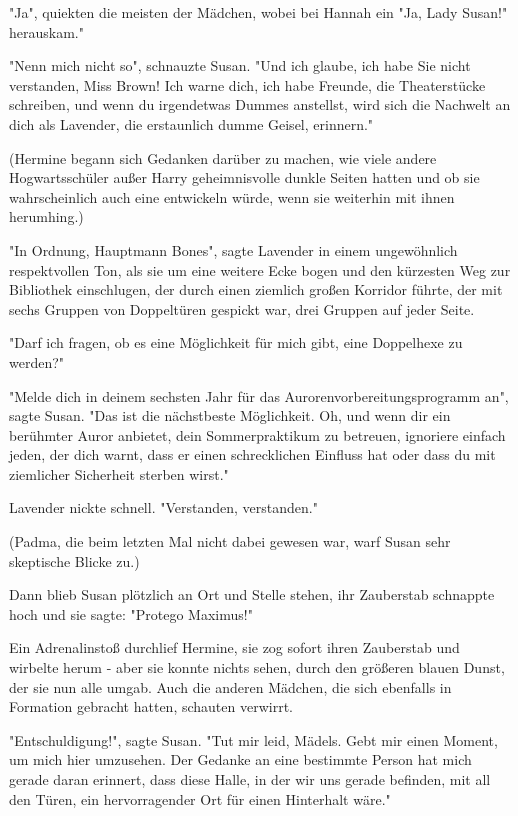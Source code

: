 {"Ja", quiekten die meisten der Mädchen, wobei bei Hannah ein "Ja, Lady Susan!" herauskam."

"Nenn mich nicht so", schnauzte Susan. "Und ich glaube, ich habe Sie nicht verstanden, Miss Brown! Ich warne dich, ich habe Freunde, die Theaterstücke schreiben, und wenn du irgendetwas Dummes anstellst, wird sich die Nachwelt an dich als Lavender, die erstaunlich dumme Geisel, erinnern."

(Hermine begann sich Gedanken darüber zu machen, wie viele andere Hogwartsschüler außer Harry geheimnisvolle dunkle Seiten hatten und ob sie wahrscheinlich auch eine entwickeln würde, wenn sie weiterhin mit ihnen herumhing.)

"In Ordnung, Hauptmann Bones", sagte Lavender in einem ungewöhnlich respektvollen Ton, als sie um eine weitere Ecke bogen und den kürzesten Weg zur Bibliothek einschlugen, der durch einen ziemlich großen Korridor führte, der mit sechs Gruppen von Doppeltüren gespickt war, drei Gruppen auf jeder Seite.

"Darf ich fragen, ob es eine Möglichkeit für mich gibt, eine Doppelhexe zu werden?"

"Melde dich in deinem sechsten Jahr für das Aurorenvorbereitungsprogramm an", sagte Susan. "Das ist die nächstbeste Möglichkeit. Oh, und wenn dir ein berühmter Auror anbietet, dein Sommerpraktikum zu betreuen, ignoriere einfach jeden, der dich warnt, dass er einen schrecklichen Einfluss hat oder dass du mit ziemlicher Sicherheit sterben wirst."

Lavender nickte schnell. "Verstanden, verstanden."

(Padma, die beim letzten Mal nicht dabei gewesen war, warf Susan sehr skeptische Blicke zu.)

Dann blieb Susan plötzlich an Ort und Stelle stehen, ihr Zauberstab schnappte hoch und sie sagte: "Protego Maximus!"

Ein Adrenalinstoß durchlief Hermine, sie zog sofort ihren Zauberstab und wirbelte herum - aber sie konnte nichts sehen, durch den größeren blauen Dunst, der sie nun alle umgab. Auch die anderen Mädchen, die sich ebenfalls in Formation gebracht hatten, schauten verwirrt.

"Entschuldigung!", sagte Susan. "Tut mir leid, Mädels. Gebt mir einen Moment, um mich hier umzusehen. Der Gedanke an eine bestimmte Person hat mich gerade daran erinnert, dass diese Halle, in der wir uns gerade befinden, mit all den Türen, ein hervorragender Ort für einen Hinterhalt wäre."

}

